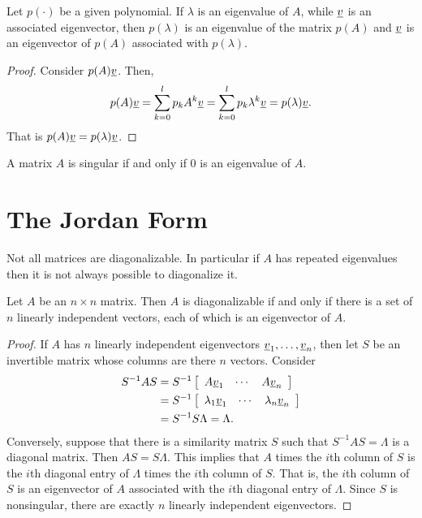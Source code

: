 \begin{theorem}
Let $p( \cdot )$ be a given polynomial.
If $\lambda$ is an eigenvalue of $A$, while $\underline{v}$ is an associated eigenvector, then $p ( \lambda )$ is an eigenvalue of the matrix $p (A)$ and $\underline{v}$ is an eigenvector of $p(A)$ associated with $p(\lambda)$.
\end{theorem}
\begin{proof}
Consider $p(A) \underline{v}$.
Then,
\begin{equation*}
p( A ) \underline{v} = \sum_{k=0}^l p_k A^k \underline{v}
= \sum_{k=0}^l p_k \lambda^k \underline{v}
= p( \lambda ) \underline{v} .
\end{equation*}
That is $p(A) \underline{v} = p( \lambda ) \underline{v}$.
\end{proof}

A matrix $A$ is singular if and only if $0$ is an eigenvalue of $A$.

\section{The Jordan Form}

Not all matrices are diagonalizable.
In particular if $A$ has repeated eigenvalues then it is not always possible to diagonalize it.

\begin{theorem}
Let $A$ be an $n \times n$ matrix.
Then $A$ is diagonalizable if and only if there is a set of $n$ linearly independent vectors, each of which is an eigenvector of $A$.
\end{theorem}

\begin{proof}
If $A$ has $n$ linearly independent eigenvectors $\underline{v}_1, \ldots, \underline{v}_n$, then let $S$ be an invertible matrix whose columns are there $n$ vectors.
Consider
\begin{equation*}
\begin{split}
S^{-1} A S &= S^{-1} \left[ \begin{array}{ccc} A \underline{v}_1 & \cdots & A \underline{v}_n \end{array} \right] \\
&= S^{-1} \left[ \begin{array}{ccc} \lambda_1 \underline{v}_1 & \cdots & \lambda_n \underline{v}_n \end{array} \right] \\
&= S^{-1} S \Lambda = \Lambda .
\end{split}
\end{equation*}
Conversely, suppose that there is a similarity matrix $S$ such that $S^{-1} A S = \Lambda$ is a diagonal matrix.
Then $A S = S \Lambda$.
This implies that $A$ times the $i$th column of $S$ is the $i$th diagonal entry of $\Lambda$ times the $i$th column of $S$.
That is, the $i$th column of $S$ is an eigenvector of $A$ associated with the $i$th diagonal entry of $\Lambda$.
Since $S$ is nonsingular, there are exactly $n$ linearly independent eigenvectors.
\end{proof}

